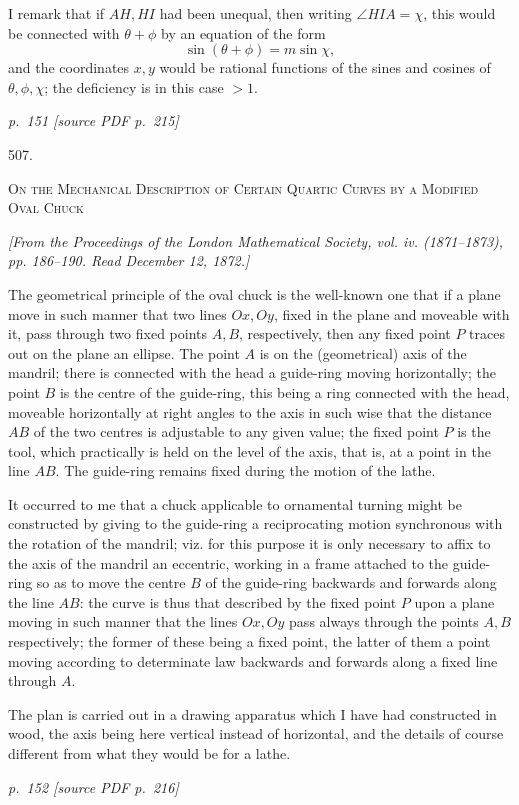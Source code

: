 \documentclass[11pt,a4paper]{article}
\newcommand{\sourcepage}[2]{%
  \bigskip
  \noindent\textit{p.~#1 [source PDF p.~#2]}%
  \par\smallskip
}
\newcommand{\paper}[2]{%
  \begin{center}
    {\Large #1.}\par\vspace{0.75em}
    {\large\scshape #2}
  \end{center}
}
\newcommand{\pubnote}[1]{%
  \begin{center}\small\itshape #1\end{center}
}
\begin{document}
I remark that if \(AH,HI\) had been unequal, then writing \(\angle HIA=\chi\), this
would be connected with \(\theta+\phi\) by an equation of the form
\[
\sin(\theta+\phi)=m\sin\chi,
\]
and the coordinates \(x,y\) would be rational functions of the sines and cosines of
\(\theta,\phi,\chi\); the deficiency is in this case \(>1\).

\sourcepage{151}{215}
\paper{507}{On the Mechanical Description of Certain Quartic Curves by a Modified Oval Chuck}
\pubnote{[From the Proceedings of the London Mathematical Society, vol. iv. (1871--1873), pp. 186--190. Read December 12, 1872.]}

The geometrical principle of the oval chuck is the well-known one that if a plane
move in such manner that two lines \(Ox,Oy\), fixed in the plane and moveable with
it, pass through two fixed points \(A,B\), respectively, then any fixed point \(P\)
traces out on the plane an ellipse. The point \(A\) is on the (geometrical) axis of
the mandril; there is connected with the head a guide-ring moving horizontally; the
point \(B\) is the centre of the guide-ring, this being a ring connected with the head,
moveable horizontally at right angles to the axis in such wise that the distance
\(AB\) of the two centres is adjustable to any given value; the fixed point \(P\) is
the tool, which practically is held on the level of the axis, that is, at a point in the
line \(AB\). The guide-ring remains fixed during the motion of the lathe.

It occurred to me that a chuck applicable to ornamental turning might be constructed
by giving to the guide-ring a reciprocating motion synchronous with the rotation of
the mandril; viz. for this purpose it is only necessary to affix to the axis of the
mandril an eccentric, working in a frame attached to the guide-ring so as to move
the centre \(B\) of the guide-ring backwards and forwards along the line \(AB\): the
curve is thus that described by the fixed point \(P\) upon a plane moving in such
manner that the lines \(Ox,Oy\) pass always through the points \(A,B\) respectively;
the former of these being a fixed point, the latter of them a point moving according
to determinate law backwards and forwards along a fixed line through \(A\).

The plan is carried out in a drawing apparatus which I have had constructed in
wood, the axis being here vertical instead of horizontal, and the details of course
different from what they would be for a lathe.

\sourcepage{152}{216}
\end{document}
